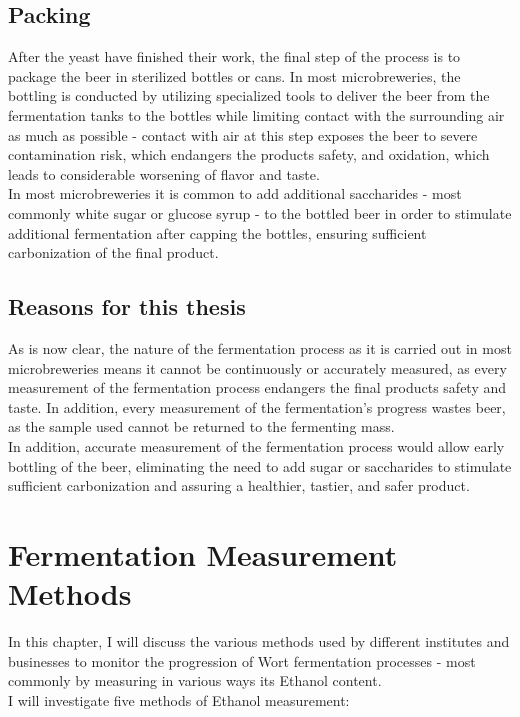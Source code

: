 \documentclass[twoside]{ctuthesis}
\theoremstyle{plain}
\theoremstyle{definition}
\theoremstyle{note}
\begin{document}
\section{Packing}
After the yeast have finished their work, the final step of the process is to package the beer in sterilized bottles or cans. In most microbreweries, the bottling is conducted by utilizing specialized tools to deliver the beer from the fermentation tanks to the bottles while limiting contact with the surrounding air as much as possible - contact with air at this step exposes the beer to severe contamination risk,  which endangers the products safety, and oxidation, which leads to considerable worsening of flavor and taste.\\
In most microbreweries it is common to add additional saccharides - most commonly white sugar or glucose syrup - to the bottled beer in order to stimulate additional fermentation after capping the bottles, ensuring sufficient carbonization of the final product.

\section{Reasons for this thesis}
As is now clear, the nature of the fermentation process as it is carried out in most microbreweries means it cannot be continuously or accurately measured, as every measurement of the fermentation process endangers the final products safety and taste. In addition, every measurement of the fermentation's progress wastes beer, as the sample used cannot be returned to the fermenting mass.\\
In addition, accurate measurement of the fermentation process would allow early bottling of the beer, eliminating the need to add sugar or saccharides to stimulate sufficient carbonization and assuring a healthier, tastier, and safer product.

\pagebreak

\begingroup
\renewcommand{\cleardoublepage}{}
\renewcommand{\clearpage}{}
\chapter{Fermentation Measurement Methods}
\endgroup

In this chapter, I will discuss the various methods used by different institutes and businesses to monitor the progression of Wort fermentation processes - most commonly by measuring in various ways its Ethanol content.\\
I will investigate five methods of Ethanol measurement:\\
\end{document}
